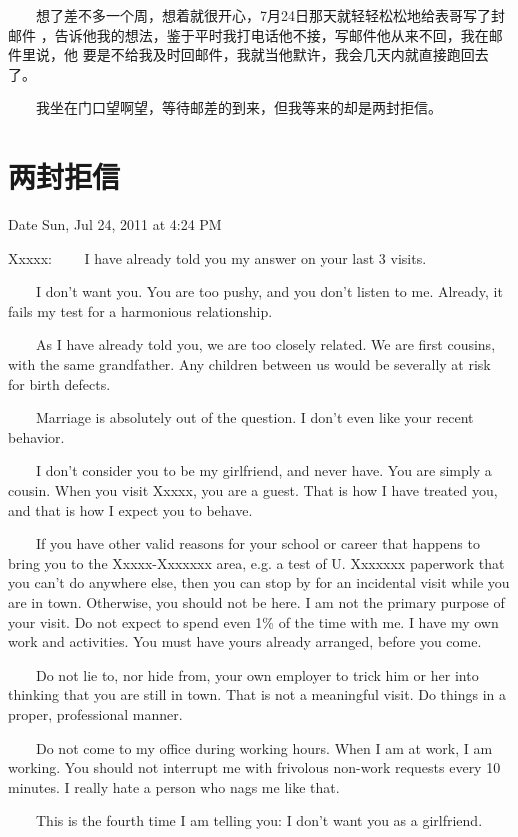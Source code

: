 \documentclass[12pt]{book}
\begin{document}
　　想了差不多一个周，想着就很开心，7月24日那天就轻轻松松地给表哥写了封邮件
，告诉他我的想法，鉴于平时我打电话他不接，写邮件他从来不回，我在邮件里说，他
要是不给我及时回邮件，我就当他默许，我会几天内就直接跑回去了。

　　我坐在门口望啊望，等待邮差的到来，但我等来的却是两封拒信。
\section{两封拒信}
\label{sec-8-25}

Date Sun, Jul 24, 2011 at 4:24 PM

Xxxxx:
　　I have already told you my answer on your last 3 visits. 

　　I don’t want you.  You are too pushy, and you don’t listen to me.  
Already, it fails my test for a harmonious relationship. 

　　As I have already told you, we are too closely related.  We are first 
cousins, with the same grandfather.  Any children between us would be 
severally at risk for birth defects. 

　　Marriage is absolutely out of the question.  I don’t even like your 
recent behavior. 

　　I don’t consider you to be my girlfriend, and never have.  You are 
simply a cousin.  When you visit Xxxxx, you are a guest.  That is how I have
treated you, and that is how I expect you to behave. 

　　If you have other valid reasons for your school or career that happens 
to  bring you to the Xxxxx-Xxxxxxx area, e.g. a test of U. Xxxxxxx paperwork
that you can’t do anywhere else, then you can stop by for an incidental 
visit while you are in town.  Otherwise, you should not be here.  I am not 
the primary purpose of your visit.  Do not expect to spend even 1\% of the 
time with me.  I have my own work and activities.  You must have yours 
already arranged, before you come. 

　　Do not lie to, nor hide from, your own employer to trick him or her into
thinking that you are still in town.  That is not a meaningful visit.  Do 
things in a proper, professional manner. 

　　Do not come to my office during working hours.  When I am at work, I am 
working.  You should not interrupt me with frivolous non-work requests every
10 minutes.  I really hate a person who nags me like that. 

　　This is the fourth time I am telling you: I don’t want you as a 
girlfriend. 
\end{document}
